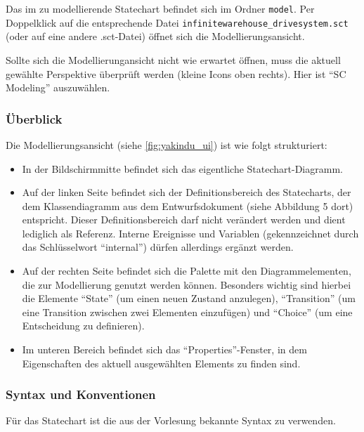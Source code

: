 Das im \docProjectTitle{} zu modellierende Statechart befindet sich im Ordner \texttt{model}. 
Per Doppelklick auf die entsprechende Datei \texttt{infinitewarehouse\_drivesystem.sct} (oder auf eine andere .sct-Datei) öffnet sich die Modellierungsansicht.

Sollte sich die Modellierungansicht nicht wie erwartet öffnen, muss die aktuell gewählte Perspektive überprüft werden (kleine Icons oben rechts). 
Hier ist \enquote{SC Modeling} auszuwählen. 


\subsubsection{Überblick}
 
Die Modellierungsansicht (siehe \autoref{fig:yakindu_ui}) ist wie folgt strukturiert:

\begin{itemize}
	\setlength\topsep{-1em}
	\setlength\itemsep{-0.5em}
	\item In der Bildschirmmitte befindet sich das eigentliche Statechart-Diagramm.
	\item Auf der linken Seite befindet sich der Definitionsbereich des Statecharts, der dem Klassendiagramm aus dem Entwurfsdokument (siehe Abbildung 5 dort) entspricht. 
	Dieser Definitionsbereich darf nicht verändert werden und dient lediglich als Referenz. 
	Interne Ereignisse und Variablen (gekennzeichnet durch das Schlüsselwort \enquote{internal}) dürfen allerdings ergänzt werden.
	\item Auf der rechten Seite befindet sich die Palette mit den Diagrammelementen, die zur Modellierung genutzt werden können. 
	Besonders wichtig sind hierbei die Elemente \enquote{State} (um einen neuen Zustand anzulegen), \enquote{Transition} (um eine Transition zwischen zwei Elementen einzufügen) und \enquote{Choice} (um eine Entscheidung zu definieren).
	\item Im unteren Bereich befindet sich das \enquote{Properties}-Fenster, in dem Eigenschaften des aktuell ausgewählten Elements zu finden sind.
\end{itemize}


\enlargethispage{2\baselineskip}

\subsubsection{Syntax und Konventionen}

Für das Statechart ist die aus der Vorlesung bekannte Syntax zu verwenden.

